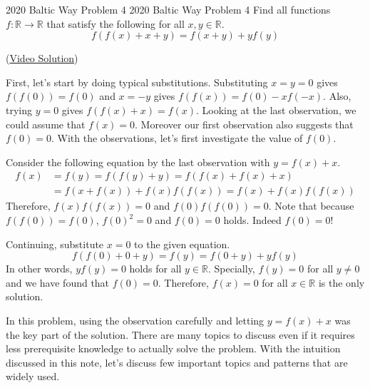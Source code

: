 \documentclass[../../main.tex]{subfiles}
\begin{document}
\begin{problem}
{2020 Baltic Way Problem 4 \easy}
{2020 Baltic Way Problem 4}
Find all functions $f: \mathbb{R} \rightarrow \mathbb{R}$ that
satisfy the following for all $x, y \in \mathbb{R}$.
\[
f(f(x) + x + y) = f(x + y) + yf(y)
\]
\end{problem}
(\href{https://youtu.be/STy74sON1Ho}{Video Solution})
\begin{solution}
First, let's start by doing typical substitutions. Substituting
$x = y = 0$ gives $f(f(0)) = f(0)$ and $x = -y$ gives
$f(f(x)) = f(0) - xf(-x)$. Also, trying $y = 0$ gives $f(f(x) + x)
= f(x)$. Looking at the last observation, we could assume that
$f(x) = 0$. Moreover our first observation also suggests that
$f(0) = 0$. With the observations, let's first investigate the
value of $f(0)$.

Consider the following equation by the last observation with
$y = f(x) + x$.
\begin{align*}
    f(x)
    &= f(y)
    = f(f(y) + y)
    = f(f(x) + f(x) + x) \\
    &= f(x + f(x)) + f(x) f(f(x))
    = f(x) + f(x) f(f(x))
\end{align*}
Therefore, $f(x) f(f(x)) = 0$ and $f(0) f(f(0)) = 0$. Note that
because $f(f(0)) = f(0)$, $f(0)^2 = 0$ and $f(0) = 0$ holds.
Indeed $f(0) = 0$!

Continuing, substitute $x = 0$ to the given equation.
\[
f(f(0) + 0 + y)
= f(y)
= f(0 + y) + y f(y)
\]
In other words, $y f(y) = 0$ holds for all $y \in \mathbb{R}$.
Specially, $f(y) = 0$ for all $y \neq 0$ and we have found that
$f(0) = 0$. Therefore, $f(x) = 0$ for all $x \in \mathbb{R}$ is
the only solution.
\end{solution}

In this problem, using the observation carefully and letting
$y = f(x) + x$ was the key part of the solution. There are
many topics to discuss even if it requires less prerequisite
knowledge to actually solve the problem. With the intuition
discussed in this note, let's discuss few important topics and
patterns that are widely used.
\end{document}
